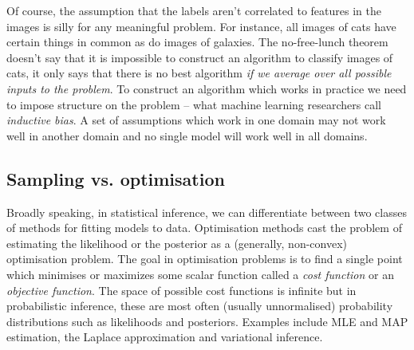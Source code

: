 \documentclass[12pt,dvipsnames]{report}
\renewcommand{\vec}[1]{\boldsymbol{\mathbf{#1}}}
\begin{document}
Of course, the assumption that the labels aren't correlated to features in the
images is silly for any meaningful problem. For instance, all images of cats
have certain things in common as do images of galaxies. The no-free-lunch
theorem doesn't say that it is impossible to construct an algorithm to classify
images of cats, it only says that there is no best algorithm \emph{if we
    average over all possible inputs to the problem}. To construct an algorithm
which works in practice we need to impose structure on the problem -- 
what machine learning researchers call \emph{inductive bias}. A set of assumptions
which work in one domain may not work well in another domain and no single
model will work well in all domains.

\subsection{Sampling vs. optimisation}
\label{ssec:sampling_vs_optimisation}

Broadly speaking, in statistical inference, we can differentiate between two
classes of methods for fitting models to data. Optimisation methods cast the
problem of estimating the likelihood or the posterior as a (generally,
non-convex) optimisation problem. The goal in optimisation problems is to find
a single point which minimises or maximizes some scalar function called a
\emph{cost function} or an \emph{objective function}. The space of possible
cost functions is infinite but in probabilistic inference, these are most often (usually
unnormalised) probability distributions such as likelihoods and posteriors. 
Examples include MLE and MAP estimation, the Laplace approximation and
variational inference.
\end{document}
